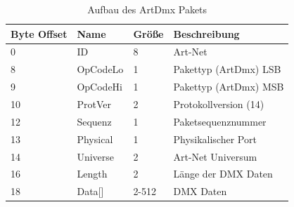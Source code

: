 \documentclass[11pt]{scrartcl}
\begin{document}
\begin{table}[H]
    \begin{tabularx}{\textwidth}{|l|l|l|X|}
        \hline Byte Offset & Name & Größe & Beschreibung\\\hline
        0 & ID & 8 & Art-Net\\\hline
        8 & OpCodeLo & 1 & Pakettyp (ArtDmx) LSB\\\hline
        9 & OpCodeHi & 1 & Pakettyp (ArtDmx) MSB\\\hline
        10 & ProtVer & 2 & Protokollversion (14)\\\hline
        12 & Sequenz & 1 & Paketsequenznummer\\\hline
        13 & Physical & 1 & Physikalischer Port\\\hline
        14 & Universe & 2 & Art-Net Universum\\\hline
        16 & Length & 2 & Länge der DMX Daten\\\hline
        18 & Data[] & 2-512 & DMX Daten\\\hline
    \end{tabularx}
    \caption{Aufbau des ArtDmx Pakets}\label{tab:ArtDmxDefinition}
\end{table}
\noindent
\cite{artdmx}
\clearpage
\end{document}
